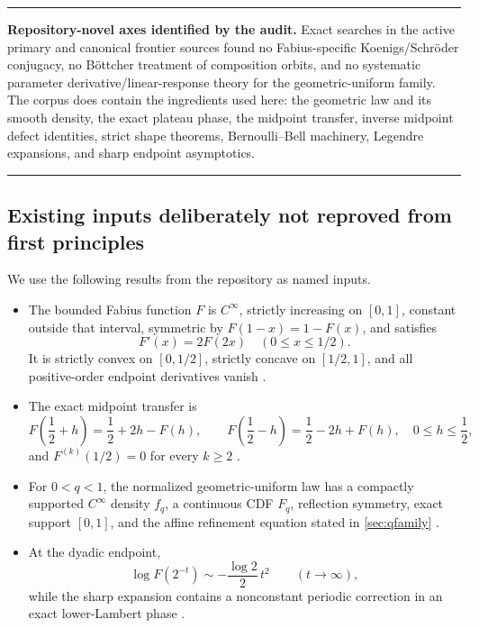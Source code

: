 \documentclass[11pt,oneside]{article}
\theoremstyle{definition}
\theoremstyle{remark}
\newenvironment{statusbox}{%
  \par\smallskip\noindent\begin{center}\begin{minipage}{0.94\textwidth}%
  \hrule\vspace{0.55em}\small
}{%
  \vspace{0.55em}\hrule\end{minipage}\end{center}\smallskip
}
\begin{document}
\begin{statusbox}
\textbf{Repository-novel axes identified by the audit.}
Exact searches in the active primary and canonical frontier sources found no Fabius-specific
Koenigs/Schr\"oder conjugacy, no B\"ottcher treatment of composition orbits, and no systematic
parameter derivative/linear-response theory for the geometric-uniform family.  The corpus does
contain the ingredients used here: the geometric law and its smooth density, the exact plateau
phase, the midpoint transfer, inverse midpoint defect identities, strict shape theorems,
Bernoulli--Bell machinery, Legendre expansions, and sharp endpoint asymptotics.
\end{statusbox}

\subsection{Existing inputs deliberately not reproved from first principles}

We use the following results from the repository as named inputs.

\begin{itemize}
\item The bounded Fabius function \(F\) is \(C^\infty\), strictly increasing on \([0,1]\),
constant outside that interval, symmetric by \(F(1-x)=1-F(x)\), and satisfies
\[
 F'(x)=2F(2x)\quad(0\le x\le1/2).
\]
It is strictly convex on \([0,1/2]\), strictly concave on \([1/2,1]\), and all positive-order
endpoint derivatives vanish \cite{repoPrimary}.
\item The exact midpoint transfer is
\begin{equation}
 F\!\left(\frac12+h\right)=\frac12+2h-F(h),\qquad
 F\!\left(\frac12-h\right)=\frac12-2h+F(h),
 \quad 0\le h\le\frac12,
 \label{eq:midpoint-transfer-input}
\end{equation}
and \(F^{(k)}(1/2)=0\) for every \(k\ge2\) \cite{repoPrimary}.
\item For \(0<q<1\), the normalized geometric-uniform law has a compactly supported
\(C^\infty\) density \(f_q\), a continuous CDF \(F_q\), reflection symmetry, exact support
\([0,1]\), and the affine refinement equation stated in \cref{sec:qfamily}
\cite{repoPrimary}.
\item At the dyadic endpoint,
\begin{equation}
 \log F(2^{-t})\sim-\frac{\log2}{2}\,t^2\qquad(t\to\infty),
 \label{eq:dyadic-leading-input}
\end{equation}
while the sharp expansion contains a nonconstant periodic correction in an exact lower-Lambert
phase \cite{repoPrimary,repoFrontier}.
\end{itemize}
\end{document}
